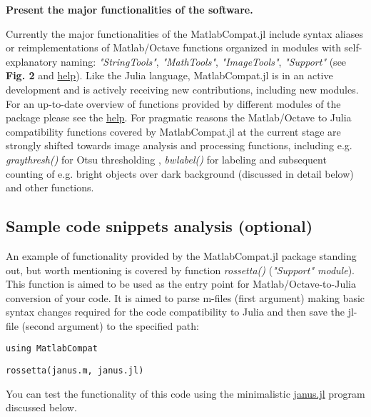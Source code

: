 \textbf{Present the major functionalities of the software.}

Currently the major functionalities of the MatlabCompat.jl include syntax aliases or reimplementations of Matlab/Octave functions organized in modules with self-explanatory naming: \textit{"StringTools"}, \textit{"MathTools"}, \textit{"ImageTools"}, \textit{"Support"} (see \textbf{Fig. 2} and \href{http://matlabcompat.github.io/help.html}{help}). Like the Julia language, MatlabCompat.jl is in an active development and is actively receiving new contributions, including new modules. For an up-to-date overview of functions provided by different modules of the package please see the \href{http://matlabcompat.github.io/help.html}{help}. For pragmatic reasons the Matlab/Octave to Julia compatibility functions covered by MatlabCompat.jl at the current stage are strongly shifted towards image analysis and processing functions, including e.g. \textit{graythresh()} for Otsu thresholding \cite{otsu1975threshold}, \textit{bwlabel()} for labeling and subsequent counting of e.g. bright objects over dark background (discussed in detail below) and other functions.

\subsection{Sample code snippets analysis (optional)}
\label{Snippets}

An example of functionality provided by the MatlabCompat.jl package standing out, but worth mentioning is covered by function \textit{rossetta()} (\textit{"Support" module}). This function is aimed to be used as the entry point for Matlab/Octave-to-Julia conversion of your code. It is aimed to parse m-files (first argument) making basic syntax changes required for the code compatibility to Julia and then save the jl-file (second argument) to the specified path:

\verb|using MatlabCompat|

\verb|rossetta(janus.m, janus.jl)|

You can test the functionality of this code using the minimalistic \href{https://github.com/MatlabCompat/MatlabCompat.jl/blob/dev/test/janus.m}{janus.jl} program discussed below.
  
  
  
  
  